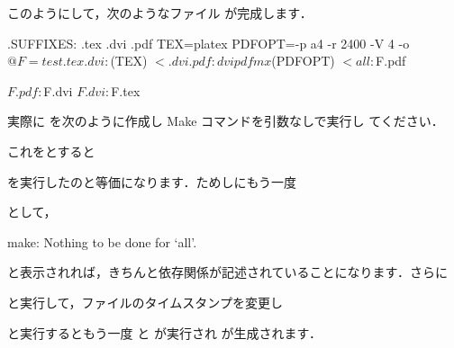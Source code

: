 このようにして，次のようなファイル  が完成します．
\begin{Makefile}
.SUFFIXES: .tex .dvi .pdf
TEX=platex
PDFOPT=-p a4 -r 2400 -V 4 -o $@
F=test

.tex.dvi:
	$(TEX) $<
.dvi.pdf:
	dvipdfmx $(PDFOPT) $<

all:	$F.pdf

$F.pdf: $F.dvi
$F.dvi: $F.tex
\end{Makefile}
実際に  を次のように作成し Make コマンドを引数なしで実行し
てください．
これをとすると
\begin{InTerm}
\end{InTerm}
を実行したのと等価になります．ためしにもう一度
\begin{InTerm}
\end{InTerm}
として，
\begin{OutTerm}
 make: Nothing to be done for `all'.
\end{OutTerm}
と表示されれば，きちんと依存関係が記述されていることになります．さらに
\begin{InTerm}
\end{InTerm}
と実行して，ファイルのタイムスタンプを変更し
\begin{InTerm}
\end{InTerm}
と実行するともう一度 \pLaTeX と \dvipdfmx が実行され  が生成されます．

